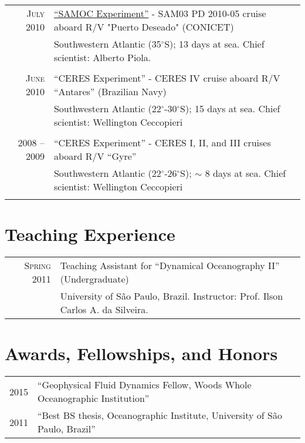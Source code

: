 \documentclass[pagestart=firstchapter]{article}
\begin{document}
\begin{tabular}{rl}

    \textsc{July  2010} & \href{http://www.aoml.noaa.gov/phod/research/moc/samoc/}{``SAMOC Experiment''} - SAM03 PD 2010-05 cruise  aboard R/V "Puerto Deseado" (CONICET) \\
                        & Southwestern Atlantic (35$^\circ$S); 13 days at sea. Chief scientist: Alberto Piola.\\ 
  &\\ 
 \textsc{June  2010} & ``CERES Experiment'' - CERES IV cruise  aboard R/V ``Antares'' (Brazilian Navy)  \\
                     & Southwestern Atlantic (22$^\circ$-30$^\circ$S); 15 days at sea. Chief scientist: Wellington Ceccopieri\\
  &\\ 
\textsc{2008 -- 2009} & ``CERES Experiment'' - CERES I, II, and III cruises  aboard R/V ``Gyre''  \\
                     & Southwestern Atlantic (22$^\circ$-26$^\circ$S); $\sim$ 8 days at sea. Chief scientist: Wellington Ceccopieri\\
  &\\ 

\end{tabular}




\section*{Teaching Experience}

\begin{tabular}{rl}
    \textsc{Spring 2011} & Teaching Assistant for ``Dynamical Oceanography II'' (Undergraduate)\\
    & University of S\~ao Paulo, Brazil. Instructor: Prof. Ilson Carlos A. da Silveira. \\
\end{tabular}
 

\section*{Awards, Fellowships, and Honors}
\begin{tabular}{rl}
\textsc{2015} & ``Geophysical Fluid Dynamics Fellow, Woods Whole Oceanographic Institution''\\
\textsc{2011} & ``Best BS thesis, Oceanographic Institute, University of S\~ao Paulo, Brazil''
\end{tabular}
\end{document}
